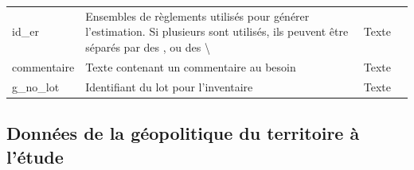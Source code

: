 \begin{table}[h]
\begin{tabular}{m{}|m{}m{}m{}}
                    id\_er & 
                    Ensembles de règlements utilisés pour générer l'estimation. Si plusieurs sont utilisés, ils peuvent être séparés par des , ou des \textbackslash & 
                    Texte & 
                    \\ 

                    commentaire & 
                    Texte contenant un commentaire au besoin & 
                    Texte & 
                    \\ 

                    g\_no\_lot & 
                    Identifiant du lot pour l'inventaire & 
                    Texte & 
                    \\
                    \hline
                \end{tabular}  
            \end{table}

    \subsection{Données de la géopolitique du territoire à l'étude} \label{ssec:data-geopolitique-territoire}
